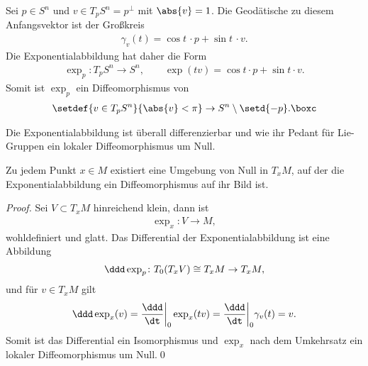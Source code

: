 \documentclass[%
	paper=a5,%
	fleqn,%
	DIV=18,%
	BCOR=0mm,
	fontsize=11pt,
	titlepage=false,%
	bibliography=totoc,
	DIV=18,%
	twoside=true,
	pdftitle=Riemannsche Geometrie,
	pdfauthor=Uwe Semmelmann,
	numbers=noendperiod]%
	{scrbook}
\begin{document}
\begin{ex}
Sei $p\in S^n$ und $v\in T_pS^n = p^\bot$ mit $\abs{v} = 1$. Die Geodätische zu diesem
Anfangsvektor ist der Großkreis
\begin{align*}
\gamma_v(t) = \cos t\,\cdot p+ \sin t\, \cdot v. 
\end{align*}
Die Exponentialabbildung hat daher die Form
\begin{align*}
\exp_p : T_pS^n \to S^n,\qquad \exp(tv) = \cos t\cdot p + \sin t\cdot v.
\end{align*}
Somit ist $\exp_p$ ein Diffeomorphismus von
\begin{align*}
\setdef{v\in T_pS^n}{\abs{v}< \pi} \to S^n\setminus\setd{-p}.\boxc
\end{align*}
\end{ex}

Die Exponentialabbildung ist überall differenzierbar und wie ihr Pedant für Lie-Gruppen ein lokaler Diffeomorphismus um Null.


\begin{prop}
Zu jedem Punkt $x\in M$ existiert eine Umgebung von Null in $T_xM$, auf
der die Exponentialabbildung ein Diffeomorphismus auf ihr Bild ist.\fish
\end{prop}
\begin{proof}
Sei $V\subset T_xM$ hinreichend klein, dann ist
\begin{align*}
\exp_x : V\to M,
\end{align*}
wohldefiniert und glatt. Das Differential der Exponentialabbildung ist eine
Abbildung
\begin{align*}
\ddd \exp_p\colon T_0(T_xV)\cong T_xM \to T_xM,
\end{align*}
und für $v\in T_xM$ gilt
\begin{align*}
\ddd \exp_x(v) = \frac{\ddd}{\dt}\bigg|_0 \exp_x(tv)
= \frac{\ddd}{\dt}\bigg|_0 \gamma_v(t)
= v.
\end{align*}
Somit ist das Differential ein Isomorphismus und $\exp_x$ nach dem Umkehrsatz
ein lokaler Diffeomorphismus um Null.\qed
\end{proof}
\end{document}
